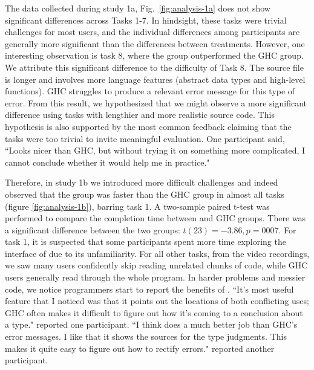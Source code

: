 The data collected during study 1a, Fig.~\ref{fig:analysis-1a} does not show significant differences across Tasks 1-7. In hindsight, these tasks were trivial challenges for most users, and the individual differences among participants are generally more significant than the differences between treatments. However, one interesting observation is task 8, where the \chameleon{} group outperformed the GHC group. We attribute this significant difference to the difficulty of Task 8. The source file is longer and involves more language features (abstract data types and high-level functions). GHC struggles to produce a relevant error message for this type of error. 
From this result, we hypothesized that we might observe a more significant difference using tasks with lengthier and more realistic source code. 
This hypothesis is also supported by the most common feedback claiming that the tasks were too trivial to invite meaningful evaluation. One participant said, ``Looks nicer than GHC, but without trying it on something more complicated, I cannot conclude whether it would help me in practice." 

Therefore, in study 1b we introduced more difficult challenges and indeed observed that the \chameleon{} group was faster than the GHC group in almost all tasks (figure \ref{fig:analysis-1b}), barring task 1. A two-sample paired t-test was performed to compare the completion time between \chameleon{} and GHC groups. There was a significant difference between the two groups: $t(23) = -3.86, p = 0007$. For task 1, it is suspected that some participants spent more time exploring the interface of \chameleon{} due to its unfamiliarity. For all other tasks, from the video recordings, we saw many \chameleon{} users confidently skip reading unrelated chunks of code, while GHC users generally read through the whole program. In harder problems and messier code, we notice programmers start to report the benefits of \chameleon{}. ``It's most useful feature that I noticed was that it points out the locations of both conflicting uses; GHC often makes it difficult to figure out how it's coming to a conclusion about a type." reported one participant. ``I think \chameleon{}  does a much better job than GHC's error messages. I like that it shows the sources for the type judgments. This makes it quite easy to figure out how to rectify errors." reported another participant.



